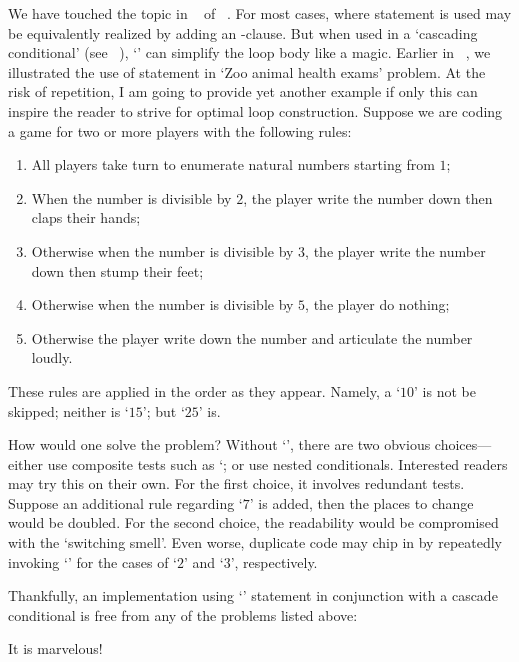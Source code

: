We have touched the topic in ~ of ~.
For most cases, where  statement is used may be
equivalently realized by adding an -clause.
But when used in a `cascading conditional' (see ~),
`' can simplify the loop body like a magic.
Earlier in ~, we illustrated the use of  statement in
`Zoo animal health exams' problem.
At the risk of repetition, I am going to provide yet another example if only this can inspire the
reader to strive for optimal loop construction.
Suppose we are coding a game for two or more players with the following rules:
\begin{enumerate}
    \item All players take turn to enumerate natural numbers starting from $1$;
    \item When the number is divisible by $2$, the player write the number down then claps their
    hands;
    \item Otherwise when the number is divisible by $3$, the player write the number down then
    stump their feet;
    \item Otherwise when the number is divisible by $5$, the player do nothing;
    \item Otherwise the player write down the number and articulate the number loudly.
\end{enumerate}
These rules are applied in the order as they appear.
Namely, a `$10$' is not be skipped;
neither is `$15$';
but `$25$' is.

How would one solve the problem?
Without `', there are two obvious choices---either use composite tests such as
`; or use nested conditionals.
Interested readers may try this on their own.
For the first choice, it involves redundant tests.
Suppose an additional rule regarding `$7$' is added, then the places to change would be doubled.
For the second choice, the readability would be compromised with the `switching
smell'\cite{Fowler1999}.
Even worse, duplicate code may chip in by repeatedly invoking `' for the
cases of `$2$' and `$3$', respectively.


Thankfully, an implementation using `' statement in conjunction
with a cascade conditional is free from any of the problems listed above:

It is marvelous!

%        
%        

